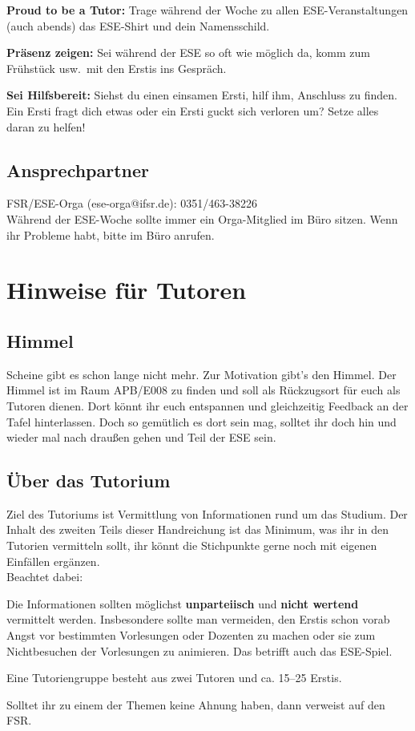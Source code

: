 \documentclass[a4paper,12pt]{report}
\begin{document}
\begin{itemize*}
    \item \textbf{Proud to be a Tutor:} Trage während der Woche zu allen ESE-Veranstaltungen (auch abends) das ESE-Shirt und dein Namensschild.
    \item \textbf{Präsenz zeigen:} Sei während der ESE so oft wie möglich da, komm zum Frühstück usw.\ mit den Erstis ins Gespräch.
    \item \textbf{Sei Hilfsbereit:} Siehst du einen einsamen Ersti, hilf ihm, Anschluss zu finden. Ein Ersti fragt dich etwas oder ein Ersti guckt sich verloren um? Setze alles daran zu helfen!
\end{itemize*}

\section*{Ansprechpartner}
FSR/ESE-Orga (ese-orga@ifsr.de): 0351/463-38226 \\

Während der ESE-Woche sollte immer ein Orga-Mitglied im Büro sitzen. Wenn ihr Probleme habt, bitte im Büro anrufen. 

\tableofcontents
\chapter{Hinweise für Tutoren}
\section{Himmel}
Scheine gibt es schon lange nicht mehr. Zur Motivation gibt's den Himmel. Der Himmel ist im Raum APB/E008 zu finden und soll als Rückzugsort für euch als Tutoren dienen. Dort könnt ihr euch entspannen und gleichzeitig Feedback an der Tafel hinterlassen. Doch so gemütlich es dort sein mag, solltet ihr doch hin und wieder mal nach draußen gehen und Teil der ESE sein.

\section{Über das Tutorium}
Ziel des Tutoriums ist Vermittlung von Informationen rund um das Studium. Der Inhalt des zweiten Teils dieser Handreichung ist das Minimum, was ihr in den Tutorien vermitteln sollt, ihr könnt die Stichpunkte gerne noch mit eigenen Einfällen ergänzen.\\
Beachtet dabei:
\begin{itemize*}
\item Die Informationen sollten möglichst \textbf{unparteiisch} und \textbf{nicht wertend} vermittelt werden.
Insbesondere sollte man vermeiden, den Erstis schon vorab Angst vor bestimmten Vorlesungen oder Dozenten zu machen oder sie zum Nichtbesuchen der Vorlesungen zu animieren. Das betrifft auch das ESE-Spiel.
\item Eine Tutoriengruppe besteht aus zwei Tutoren und ca. 15--25 Erstis.
\item Solltet ihr zu einem der Themen keine Ahnung haben, dann verweist auf den FSR\@.
\end{itemize*}
\end{document}
